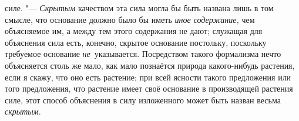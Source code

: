 силе. "--- {\em Скрытым} качеством эта сила могла бы быть названа лишь в том
смысле, что основание должно было бы иметь {\em иное содержание,} чем
объясняемое им, а между тем этого содержания не дают; служащая для объяснения
сила есть, конечно, скрытое основание постольку, поскольку требуемое основание
{\em не}~указывается. Посредством такого формализма нечто объясняется столь же
мало, как мало познаётся природа какого-нибудь растения, если я скажу, что оно
есть растение; при всей ясности такого предложения или того предложения, что
растение имеет своё основание в производящей растения силе, этот способ
объяснения в силу изложенного может быть назван весьма {\em скрытым}.

